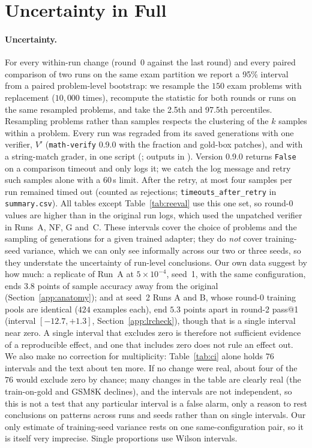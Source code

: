 \documentclass[runningheads]{llncs}
\begin{document}
\section{Uncertainty in Full}
\label{app:uncertainty}

\paragraph{Uncertainty.} For every within-run change (round~0 against the last
round) and every paired comparison of two runs on the same exam partition we
report a 95\% interval from a paired problem-level bootstrap: we resample the
$150$ exam problems with replacement ($10{,}000$ times), recompute the statistic
for both rounds or runs on the same resampled problems, and take the 2.5th and
97.5th percentiles. Resampling problems rather than samples respects the
clustering of the $k$ samples within a problem. Every run was regraded from its saved generations with one verifier, $V'$ (\texttt{math-verify} 0.9.0 with the fraction and gold-box patches), and with a string-match grader, in one script (; outputs in ). Version 0.9.0 returns \texttt{False} on a comparison timeout and only logs it; we catch the log message and retry such samples alone with a $60$\,s limit. After the retry, at most four samples per run remained timed out (counted as rejections; \texttt{timeouts\_after\_retry} in \texttt{summary.csv}). All tables except Table~\ref{tab:reeval} use this one set, so round-0 values are higher than in the original run logs, which used the unpatched verifier in Runs~A, NF, G and~C. These intervals cover the
choice of problems and the sampling of generations for a given trained adapter;
they do \emph{not} cover training-seed variance, which we can only see
informally across our two or three seeds, so they understate the uncertainty of
run-level conclusions. Our own data suggest by how much: a replicate of Run~A
at $5\times10^{-4}$, seed~1, with the same configuration, ends $3.8$ points of
sample accuracy away from the original (Section~\ref{app:anatomy}); and at
seed~2 Runs A and B, whose round-0 training pools are identical ($424$
examples each), end $5.3$ points apart in round-2 pass@1 (interval
$[-12.7,+1.3]$, Section~\ref{app:lrcheck}), though that is a single interval
near zero. A single interval that excludes zero is therefore not sufficient
evidence of a reproducible effect, and one that includes zero does not rule an
effect out. We also make no correction for multiplicity: Table~\ref{tab:ci}
alone holds $76$ intervals and the text about ten more. If no change were real,
about four of the $76$ would exclude zero by chance; many changes in the table
are clearly real (the train-on-gold and GSM8K declines), and the intervals are
not independent, so this is not a test that any particular interval is a false
alarm, only a reason to rest conclusions on patterns across runs and seeds
rather than on single intervals. Our only estimate of training-seed variance
rests on one same-configuration pair, so it is itself very imprecise. Single
proportions use Wilson intervals.
\end{document}
